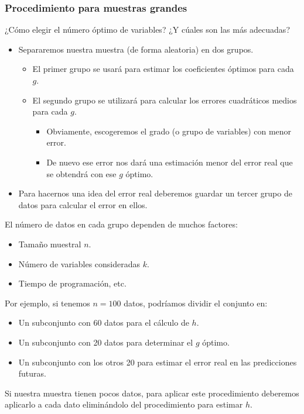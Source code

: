 \subsubsection*{Procedimiento para muestras grandes}
¿Cómo elegir el número óptimo de variables? ¿Y cúales son las más adecuadas?
\begin{itemize}
	\item Separaremos nuestra muestra (de forma aleatoria) en dos grupos.
	\begin{itemize}
		\item El primer grupo se usará para estimar los coeficientes óptimos para cada $g$.
		\item El segundo grupo se utilizará para calcular los errores cuadráticos medios para cada $g$.
		\begin{itemize}[label=$\to$]
			\item Obviamente, escogeremos el grado (o grupo de variables) con menor error.
			\item De nuevo ese error nos dará una estimación menor del error real que se obtendrá con ese $g$ óptimo.
		\end{itemize}
	\end{itemize}
	\item Para hacernos una idea del error real deberemos guardar un tercer grupo de datos para calcular el error en ellos.
\end{itemize}
El número de datos en cada grupo dependen de muchos factores:
\begin{itemize}
	\item Tamaño muestral $n$.
	\item Número de variables consideradas $k$.
	\item Tiempo de programación, etc.
\end{itemize}
Por ejemplo, si tenemos $n=100$ datos, podríamos dividir el conjunto en:
\begin{itemize}
	\item Un subconjunto con 60 datos para el cálculo de $h$.
	\item Un subconjunto con 20 datos para determinar el $g$ óptimo.
	\item Un subconjunto con los otros 20 para estimar el error real en las predicciones futuras.
\end{itemize}
Si nuestra muestra tienen pocos datos, para aplicar este procedimiento deberemos aplicarlo a cada dato eliminándolo del procedimiento para estimar $h$.
